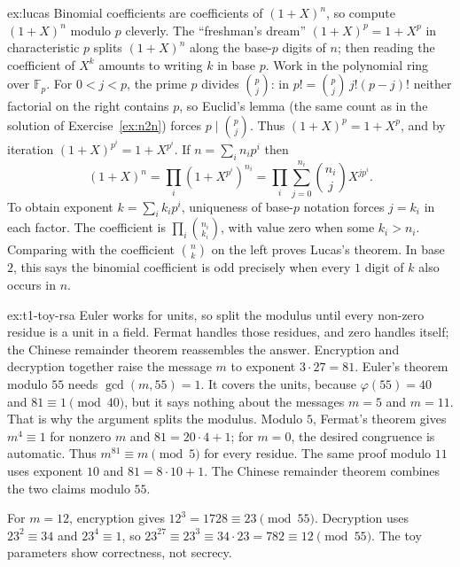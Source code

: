 \begin{solution}{ex:lucas}
\idea Binomial coefficients are coefficients of $(1+X)^n$, so compute $(1+X)^n$ modulo $p$ cleverly. The ``freshman's dream'' $(1+X)^p=1+X^p$ in characteristic $p$ splits $(1+X)^n$ along the base-$p$ digits of $n$; then reading the coefficient of $X^k$ amounts to writing $k$ in base $p$.
\writeup Work in the polynomial ring over $\mathbb F_p$. For $0<j<p$, the prime $p$ divides $\binom pj$: in $p!=\binom pj\,j!(p-j)!$ neither factorial on the right contains $p$, so Euclid's lemma (the same count as in the solution of Exercise~\ref{ex:n2n}) forces $p\mid\binom pj$. Thus $(1+X)^p=1+X^p$, and by iteration $(1+X)^{p^i}=1+X^{p^i}$. If $n=\sum_i n_ip^i$ then
\[
(1+X)^n=\prod_i(1+X^{p^i})^{n_i}
=\prod_i\sum_{j=0}^{n_i}\binom{n_i}{j}X^{jp^i}.
\]
To obtain exponent $k=\sum_i k_ip^i$, uniqueness of base-$p$ notation forces $j=k_i$ in each factor. The coefficient is $\prod_i\binom{n_i}{k_i}$, with value zero when some $k_i>n_i$. Comparing with the coefficient $\binom nk$ on the left proves Lucas's theorem. In base $2$, this says the binomial coefficient is odd precisely when every $1$ digit of $k$ also occurs in $n$.
\end{solution}

\begin{solution}{ex:t1-toy-rsa}
\idea Euler works for units, so split the modulus until every non-zero residue is a unit in a field. Fermat handles those residues, and zero handles itself; the Chinese remainder theorem reassembles the answer.
\writeup Encryption and decryption together raise the message $m$ to exponent $3\cdot27=81$. Euler's theorem modulo $55$ needs $\gcd(m,55)=1$. It covers the units, because $\varphi(55)=40$ and $81\equiv1\pmod{40}$, but it says nothing about the messages $m=5$ and $m=11$. That is why the argument splits the modulus. Modulo $5$, Fermat's theorem gives $m^4\equiv1$ for nonzero $m$ and $81=20\cdot4+1$; for $m=0$, the desired congruence is automatic. Thus $m^{81}\equiv m\pmod5$ for every residue. The same proof modulo $11$ uses exponent $10$ and $81=8\cdot10+1$. The Chinese remainder theorem combines the two claims modulo $55$.

For $m=12$, encryption gives $12^3=1728\equiv23\pmod{55}$. Decryption uses $23^2\equiv34$ and $23^4\equiv1$, so $23^{27}\equiv23^3\equiv34\cdot23=782\equiv12\pmod{55}$. The toy parameters show correctness, not secrecy.
\end{solution}

